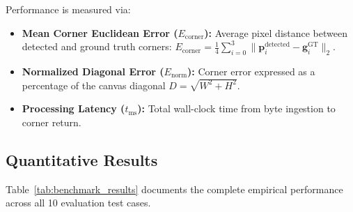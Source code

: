 \documentclass[11pt,a4paper]{article}
\begin{document}
Performance is measured via:
\begin{itemize}[leftmargin=1.5em,itemsep=0.15em]
    \item \textbf{Mean Corner Euclidean Error ($E_{\text{corner}}$):} Average pixel distance between detected and ground truth corners: $E_{\text{corner}} = \frac{1}{4} \sum_{i=0}^3 \|\mathbf{p}_i^{\text{detected}} - \mathbf{g}_i^{\text{GT}}\|_2$.
    \item \textbf{Normalized Diagonal Error ($E_{\text{norm}}$):} Corner error expressed as a percentage of the canvas diagonal $D = \sqrt{W^2 + H^2}$.
    \item \textbf{Processing Latency ($t_{\text{ms}}$):} Total wall-clock time from byte ingestion to corner return.
\end{itemize}

\subsection{Quantitative Results}
Table~\ref{tab:benchmark_results} documents the complete empirical performance across all 10 evaluation test cases.
\end{document}
